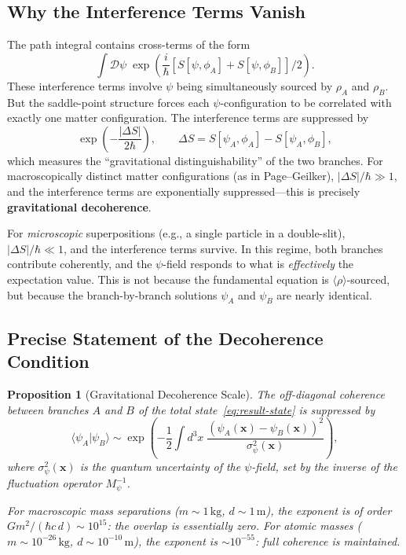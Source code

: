 \documentclass[11pt,a4paper]{article}
\newtheorem{proposition}[theorem]{Proposition}
\begin{document}
\subsection{Why the Interference Terms Vanish}

The path integral contains cross-terms of the form
\begin{equation}
\int\mathcal{D}\psi\;\exp\!\left(\frac{i}{\hbar}\left[
S[\psi,\phi_A] + S[\psi,\phi_B]
\right]/2\right).
\end{equation}
These interference terms involve $\psi$ being simultaneously sourced by
$\rho_A$ and $\rho_B$. But the saddle-point structure forces each
$\psi$-configuration to be correlated with exactly one matter
configuration. The interference terms are suppressed by
\begin{equation}
\exp\left(-\frac{|\Delta S|}{2\hbar}\right),
\qquad
\Delta S = S[\psi_A,\phi_A] - S[\psi_A,\phi_B],
\end{equation}
which measures the ``gravitational distinguishability'' of the two
branches. For macroscopically distinct matter configurations (as in
Page--Geilker), $|\Delta S|/\hbar \gg 1$, and the interference terms
are exponentially suppressed---this is precisely \textbf{gravitational
decoherence}.

For \emph{microscopic} superpositions (e.g., a single particle in a
double-slit), $|\Delta S|/\hbar \ll 1$, and the interference terms
survive. In this regime, both branches contribute coherently, and the
$\psi$-field responds to what is \emph{effectively} the expectation value.
This is not because the fundamental equation is $\langle\rho\rangle$-sourced,
but because the branch-by-branch solutions $\psi_A$ and $\psi_B$ are
nearly identical.

\subsection{Precise Statement of the Decoherence Condition}

\begin{proposition}[Gravitational Decoherence Scale]
\label{prop:decoherence}
The off-diagonal coherence between branches $A$ and $B$ of the total
state~\eqref{eq:result-state} is suppressed by
\begin{equation}\label{eq:overlap}
\langle\psi_A|\psi_B\rangle
\sim \exp\!\left(-\frac{1}{2}\int d^3x\;
\frac{(\psi_A(\mathbf{x}) - \psi_B(\mathbf{x}))^2}{\sigma_\psi^2(\mathbf{x})}
\right),
\end{equation}
where $\sigma_\psi^2(\mathbf{x})$ is the quantum uncertainty of the
$\psi$-field, set by the inverse of the fluctuation operator
$M_\psi^{-1}$.

For macroscopic mass separations ($m \sim 1\,\mathrm{kg}$,
$d \sim 1\,\mathrm{m}$), the exponent is of order $Gm^2/(\hbar c \, d)
\sim 10^{15}$: the overlap is essentially zero. For atomic masses
($m \sim 10^{-26}\,\mathrm{kg}$, $d \sim 10^{-10}\,\mathrm{m}$),
the exponent is $\sim 10^{-55}$: full coherence is maintained.
\end{proposition}
\end{document}
